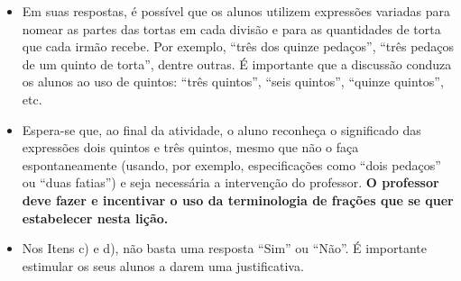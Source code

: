 \begin{atividade}
\begin{itemize}
\begin{center}
 \hspace{1em}
\hspace{1em}
\end{center}


\item       Em suas respostas, é possível que os alunos utilizem expressões variadas para nomear as partes das tortas em cada divisão e para as quantidades de torta que cada irmão recebe. Por exemplo,       ``três dos quinze pedaços'',       ``três pedaços de um quinto de torta'', dentre outras. É importante que a discussão conduza os alunos ao uso de quintos:       ``três quintos'',       ``seis quintos'',       ``quinze quintos'', etc.
\item       Espera-se que, ao final da atividade, o aluno reconheça o significado das expressões dois quintos e três quintos, mesmo que não o faça espontaneamente (usando, por exemplo, especificações como       ``dois pedaços''     ou       ``duas fatias'') e seja necessária a intervenção do professor. {\bfseries O professor deve fazer e incentivar o uso da terminologia de frações que se quer estabelecer nesta lição.}
\item       Nos Itens c) e d), não basta uma resposta       ``Sim''     ou       ``Não''. É importante estimular os seus alunos a darem uma justificativa.
\end{itemize} %


\end{atividade}

